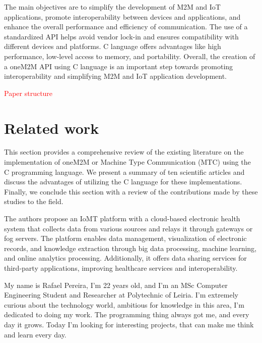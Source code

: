 \documentclass[a4paper,fleqn]{cas-dc}
\begin{document}
The main objectives are to simplify the development of M2M and IoT applications, promote interoperability between devices and applications, and enhance the overall performance and efficiency of communication. The use of a standardized API helps avoid vendor lock-in and ensures compatibility with different devices and platforms. C language offers advantages like high performance, low-level access to memory, and portability. Overall, the creation of a oneM2M API using C language is an important step towards promoting interoperability and simplifying M2M and IoT application development.

\textcolor{red}{Paper structure}

\section{Related work}

This section provides a comprehensive review of the existing literature on the implementation of oneM2M or Machine Type Communication (MTC) using the C programming language. We present a summary of ten scientific articles and discuss the advantages of utilizing the C language for these implementations. Finally, we conclude this section with a review of the contributions made by these studies to the field.

The authors propose an IoMT platform with a cloud-based electronic health system that collects data from various sources and relays it through gateways or fog servers. The platform enables data management, visualization of electronic records, and knowledge extraction through big data processing, machine learning, and online analytics processing. Additionally, it offers data sharing services for third-party applications, improving healthcare services and interoperability.


\printcredits

%
%




My name is Rafael Pereira, I'm 22 years old, and I'm an MSc Computer Engineering Student and Researcher at Polytechnic of Leiria. I'm extremely curious about the technology world, ambitious for knowledge in this area, I'm dedicated to doing my work. The programming thing always got me, and every day it grows. Today I'm looking for interesting projects, that can make me think and learn every day.
\endbio
\end{document}
